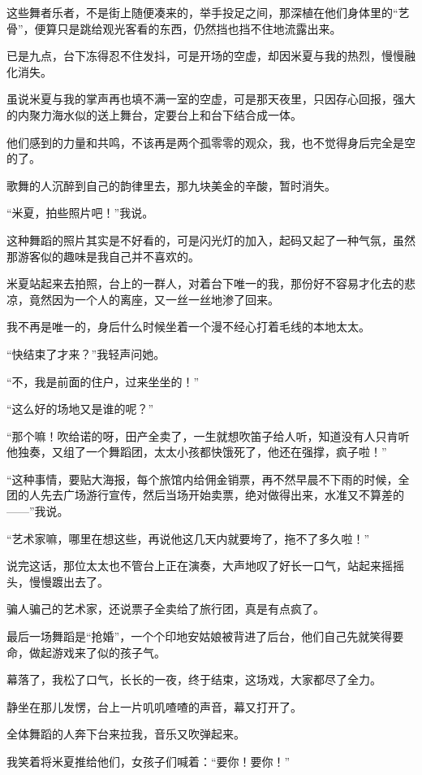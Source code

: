 \par 这些舞者乐者，不是街上随便凑来的，举手投足之间，那深植在他们身体里的“艺骨”，便算只是跳给观光客看的东西，仍然挡也挡不住地流露出来。
\par 已是九点，台下冻得忍不住发抖，可是开场的空虚，却因米夏与我的热烈，慢慢融化消失。
\par 虽说米夏与我的掌声再也填不满一室的空虚，可是那天夜里，只因存心回报，强大的内聚力海水似的送上舞台，定要台上和台下结合成一体。
\par 他们感到的力量和共鸣，不该再是两个孤零零的观众，我，也不觉得身后完全是空的了。
\par 歌舞的人沉醉到自己的韵律里去，那九块美金的辛酸，暂时消失。
\par “米夏，拍些照片吧！”我说。
\par 这种舞蹈的照片其实是不好看的，可是闪光灯的加入，起码又起了一种气氛，虽然那游客似的趣味是我自己并不喜欢的。
\par 米夏站起来去拍照，台上的一群人，对着台下唯一的我，那份好不容易才化去的悲凉，竟然因为一个人的离座，又一丝一丝地渗了回来。
\par 我不再是唯一的，身后什么时候坐着一个漫不经心打着毛线的本地太太。
\par “快结束了才来？”我轻声问她。
\par “不，我是前面的住户，过来坐坐的！”
\par “这么好的场地又是谁的呢？”
\par “那个嘛！吹给诺的呀，田产全卖了，一生就想吹笛子给人听，知道没有人只肯听他独奏，又组了一个舞蹈团，太太小孩都快饿死了，他还在强撑，疯子啦！”
\par “这种事情，要贴大海报，每个旅馆内给佣金销票，再不然早晨不下雨的时候，全团的人先去广场游行宣传，然后当场开始卖票，绝对做得出来，水准又不算差的——”我说。
\par “艺术家嘛，哪里在想这些，再说他这几天内就要垮了，拖不了多久啦！”
\par 说完这话，那位太太也不管台上正在演奏，大声地叹了好长一口气，站起来摇摇头，慢慢踱出去了。
\par 骗人骗己的艺术家，还说票子全卖给了旅行团，真是有点疯了。
\par 最后一场舞蹈是“抢婚”，一个个印地安姑娘被背进了后台，他们自己先就笑得要命，做起游戏来了似的孩子气。
\par 幕落了，我松了口气，长长的一夜，终于结束，这场戏，大家都尽了全力。
\par 静坐在那儿发愣，台上一片叽叽喳喳的声音，幕又打开了。
\par 全体舞蹈的人奔下台来拉我，音乐又吹弹起来。
\par 我笑着将米夏推给他们，女孩子们喊着：“要你！要你！”
